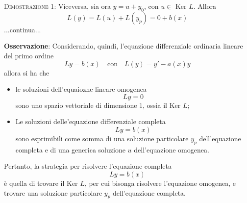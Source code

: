 \documentclass[a4paper]{extarticle}
\begin{document}
\vspace{2em}
\noindent
\normalfont \normalsize
\textsc{Dimostrazione 1}: Viceversa, sia ora $y=u+y_0$, con $u \in \text{ Ker } L$. Allora
\[L(y) = L(u) + L(y_p) = 0 + b(x)\]
...continua...

\vspace{2em}
\noindent
\textbf{Osservazione}: Considerando, quindi, l'equazione differenziale ordinaria lineare del primo ordine
\[L y = b(x) \hspace{1em} \text{con} \hspace{1em} L(y) = y' - a(x) y\]
allora si ha che
\begin{itemize}
    \item le soluzioni dell'equaiozne lineare omogenea
    \[L y = 0\]
    sono uno spazio vettoriale di dimensione $1$, ossia il Ker $L$;
    \item Le soluzioni delle'equazione differenziale completa
    \[L y = b(x)\]
    sono esprimibili come somma di una soluzione particolare $y_p$ dell'equazione completa e di una generica soluzione $u$ dell'equazione omogenea.
\end{itemize}
Pertanto, la strategia per risolvere l'equazione completa
\[L y = b(x)\]
è quella di trovare il Ker $L$, per cui bisonga risolvere l'equazione omogenea, e trovare una soluzione particolare $y_p$ dell'equazione completa.

\vspace{1em}
\noindent
\end{document}
